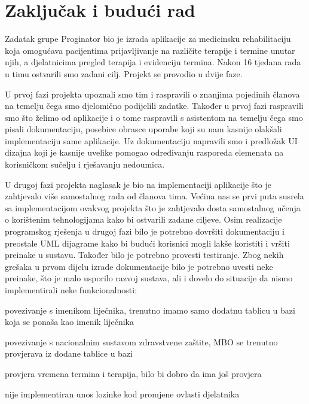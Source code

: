 \chapter{Zaključak i budući rad}
		 
		 Zadatak grupe Proginator bio je izrada aplikacije za medicinsku rehabilitaciju koja omogućava pacijentima prijavljivanje na različite terapije i termine unutar njih, a djelatnicima pregled terapija i evidenciju termina. Nakon 16 tjedana rada u timu ostvarili smo zadani cilj. Projekt se provodio u dvije faze.
		 
		 U prvoj fazi projekta upoznali smo tim i raspravili o znanjima pojedinih članova na temelju čega smo djelomično podijelili zadatke. Također u prvoj fazi raspravili smo što želimo od aplikacije i o tome raspravili s asistentom na temelju čega smo pisali dokumentaciju, posebice obrasce uporabe koji su nam kasnije olakšali implementaciju same aplikacije. Uz dokumentaciju napravili smo i predložak UI dizajna koji je kasnije uvelike pomogao određivanju rasporeda elemenata na korisničkom sučelju i rješavanju nedoumica.
		 
		 U drugoj fazi projekta naglasak je bio na implementaciji aplikacije što je zahtjevalo više samostalnog rada od članova tima. Većina nas se prvi puta susrela sa implementacijom ovakvog projekta što je zahtjevalo dosta samostalnog učenja o korištenim tehnologijama kako bi ostvarili zadane ciljeve. Osim realizacije programskog rješenja u drugoj fazi bilo je potrebno dovršiti dokumentaciju i preostale UML dijagrame kako bi budući korisnici mogli lakše koristiti i vršiti preinake u sustavu. Također bilo je potrebno provesti testiranje. Zbog nekih grešaka u prvom dijelu izrade dokumentacije bilo je potrebno uvesti neke preinake, što je malo usporilo razvoj sustava, ali i dovelo do situacije da nismo implementirali neke funkcionalnosti:
		 \begin{packed_enum}
		 	
		 	\item[-] povezivanje s imenikom liječnika, trenutno imamo samo dodatnu tablicu u bazi koja se ponaša kao imenik liječnika
		 	\item[-] povezivanje s nacionalnim sustavom zdravstvene zaštite, MBO se trenutno provjerava iz dodane tablice u bazi
		 	\item[-] provjera vremena termina i terapija, bilo bi dobro da ima još provjera
		 	\item[-] nije implementiran unos lozinke kod promjene ovlasti djelatnika
		 \end{packed_enum}
		 

